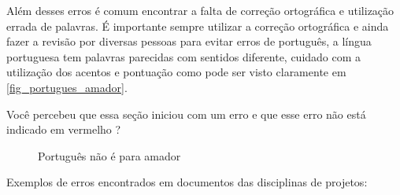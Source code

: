 Além desses erros é comum encontrar a falta de correção ortográfica e utilização errada de palavras. É importante sempre utilizar a correção ortográfica e ainda fazer a revisão por diversas pessoas para evitar erros de português, a língua portuguesa tem palavras parecidas com sentidos diferente, cuidado com a utilização dos acentos e pontuação como pode ser visto claramente em  \autoref{fig_portugues_amador}.

Você percebeu que essa seção iniciou com um erro e que esse erro não está indicado em vermelho ?


\begin{figure}[htb]
    \centering
	\caption{\label{fig_portugues_amador}Português não é para amador}
\end{figure}


Exemplos de erros encontrados em documentos das disciplinas de projetos:


